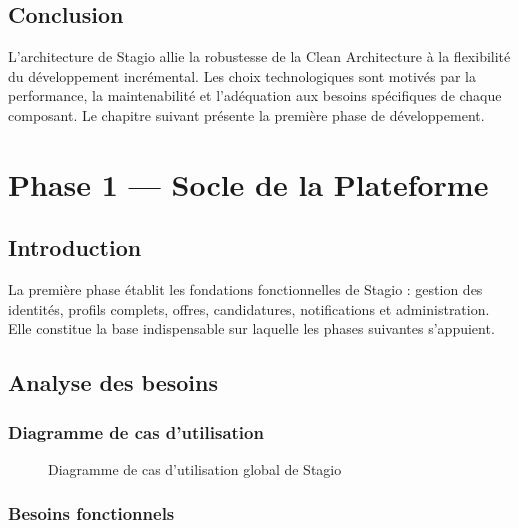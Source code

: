 ﻿\documentclass[12pt,a4paper]{report}
\begin{document}
\section*{Conclusion}
L'architecture de Stagio allie la robustesse de la Clean Architecture à la flexibilité du développement incrémental. Les choix technologiques sont motivés par la performance, la maintenabilité et l'adéquation aux besoins spécifiques de chaque composant. Le chapitre suivant présente la première phase de développement.

\chapter{Phase 1 — Socle de la Plateforme}

\section*{Introduction}
La première phase établit les fondations fonctionnelles de Stagio : gestion des identités, profils complets, offres, candidatures, notifications et administration. Elle constitue la base indispensable sur laquelle les phases suivantes s'appuient.

\section{Analyse des besoins}

\subsection{Diagramme de cas d'utilisation}

\begin{figure}[H]
\centering
\resizebox{0.97\textwidth}{!}{}
\caption{Diagramme de cas d'utilisation global de Stagio}
\label{fig:usecase}
\end{figure}

\subsection{Besoins fonctionnels}
\end{document}
